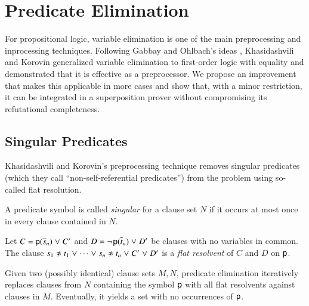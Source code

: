 \section{Predicate Elimination}
\label{sec:satfol:predicate-elimination}

For propositional logic, variable elimination \cite{eb-2005-satpreprocess} is
one of the main preprocessing and inprocessing techniques. Following Gabbay and Ohlbach's ideas
\cite{go-1992-so-pred-elim}, Khasidashvili and Korovin \cite{kk-2016-pe-fol}
generalized variable elimination to first-order logic with equality and
demonstrated that it is effective as a preprocessor. We propose an improvement
that makes this applicable in more cases and show that, with a minor
restriction, it can be integrated in a superposition prover
without compromising its refutational completeness.

\subsection{Singular Predicates}

Khasidashvili and Korovin's preprocessing technique removes singular predicates
(which they call ``non-self-referential predicates'') from the problem using
so-called flat resolution.

\begin{defi}
   A predicate symbol is called \emph{singular}
   for a clause set $N$ if it occurs at most once in every clause contained in
   $N.$
\end{defi}

\begin{defi}
   \label{def:flat-res}
   Let $C = {\mathsf{p}(\overline{s}_{n})} \mathrel{\lor} C'$ and $D =
   \neg{\kern.2ex \mathsf{p}(\overline{t}_{n})} \mathrel{\lor} D'$ be clauses with no variables in
   common. The clause $\neqlit{s_1}{t_1} \cor \cdots \cor \neqlit{s_n}{t_n}
   \cor C' \cor D'$ is a \emph{flat resolvent} of $C$ and $D$ on $\mathsf{p}$.
\end{defi}


Given two (possibly identical) clause sets $M, N$, predicate elimination
iteratively replaces clauses from $N$ containing the symbol $\mathsf{p}$ with all flat
resolvents against clauses in $M$. Eventually, it yields a
set with no occurrences of $\mathsf{p}$.


